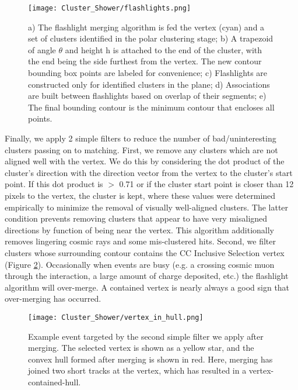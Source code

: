 \begin{figure}[h!]
\centering
\texttt{[image: Cluster\_Shower/flashlights.png]}
\caption{ a) The flashlight merging algorithm is fed the vertex (cyan) and a set of clusters identified in the polar clustering stage; b) A trapezoid of angle $\theta$ and height h is attached to the end of the cluster, with the end being the side furthest from the vertex.  The new contour bounding box points are labeled for convenience; c) Flashlights are constructed only for identified clusters in the plane; d) Associations are built between flashlights based on overlap of their segments; e) The final bounding contour is the minimum contour that encloses all points.  }
\label{fig:misc_flashlights}
\end{figure}

\par Finally, we apply 2 simple filters to reduce the number of bad/uninteresting clusters passing on to matching. First, we remove any clusters which are not aligned well with the vertex.  We do this by considering the dot product of the cluster's direction with the direction vector from the vertex to the cluster's start point.  If this dot product is $>$ 0.71 or if the cluster start point is closer than 12 pixels to the vertex, the cluster is kept, where these values were determined empirically to minimize the removal of visually well-aligned clusters.  The latter condition prevents removing clusters that appear to have very misaligned directions by function of being near the vertex. This algorithm additionally removes lingering cosmic rays and some mis-clustered hits. Second, we filter clusters whose surrounding contour contains the CC Inclusive Selection vertex (Figure \ref{fig:vertex_in_hull}). Occasionally when events are busy (e.g. a crossing cosmic muon through the interaction, a large amount of charge deposited, etc.) the flashlight algorithm will over-merge. A contained vertex is nearly always a good sign that over-merging has occurred.  

\begin{figure}[H]
\centering
\texttt{[image: Cluster\_Shower/vertex\_in\_hull.png]}
\caption{Example event targeted by the second simple filter we apply after merging. The selected vertex is shown as a yellow star, and the convex hull formed after merging is shown in red. Here, merging has joined two short tracks at the vertex, which has resulted in a vertex-contained-hull. }
\label{fig:vertex_in_hull}
\end{figure}


